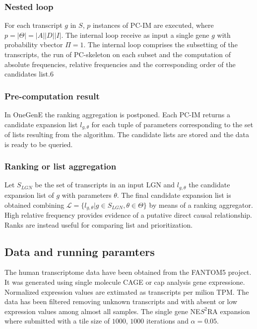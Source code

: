 		\subsubsection{Nested loop}
		For each transcript $g$ in $S$, $p$ instances of PC-IM are executed, where $p=|\Theta| = |A||D||I|$.
		The internal loop receive as input a single gene $g$ with probability vbector $\Pi = 1$.
		The internal loop comprises the subsetting of the transcripts, the run of PC-skeleton on each subset and the computation of absolute frequencies, relative frequencies and the corresponding order of the candidates list.6

		\subsubsection{Pre-computation result}
		In OneGenE the ranking aggregation is postponed.
		Each PC-IM returns a candidate expansion list $l_{g,\theta}$ for each tuple of parameters corresponding to the set of lists resulting from the algorithm.
		The candidate lists are stored and the data is ready to be queried.

		\subsubsection{Ranking or list aggregation}
		Let $S_{LGN}$ be the set of transcripts in an input LGN and $l_{g,\theta}$ the candidate expansion list of $g$ with parameters $\theta$.
		The final candidate expansion list is obtained combining $\mathcal{L} = \{l_{g,\theta}| g\in S_{LGN}, \theta\in\Theta\}$ by means of a ranking aggregator.
		High relative frequency provides evidence of a putative direct causal relationship.
		Ranks are instead useful for comparing list and prioritization.

	\subsection{Data and running paramters}
	The human transcriptome data have been obtained from the FANTOM5 project.
	It was generated using single molecule CAGE or cap analysis gene expressione.
	Normalized expression values are extimated as transcripts per milion TPM.
	The data has been filtered removing unknown transcripts and with absent or low expression values among almost all samples.
	The single gene NE$S^2$RA expansion where submitted with a tile size of $1000$, $1000$ iterations and $\alpha=0.05$.
